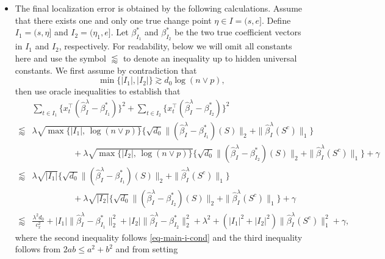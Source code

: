 \documentclass[twoside]{article}
\begin{document}
\begin{itemize}
			The fact that $\gamma$ is linear in the number of change point $K$ is to prompt the consistency.  This is shown in \eqref{eq:Khat=K} in the proof of . 
		\item The final localization error is obtained by the following calculations.  Assume that there exists one and only one true change point $\eta \in I = (s, e]$.  Define $I_1 = (s, \eta]$ and $I_2 = (\eta_1, e]$.  Let $\beta^*_{I_1}$ and $\beta^*_{I_2}$ be the two true coefficient vectors in $I_1$ and $I_2$, respectively.   For readability, below we will omit all constants here and use the symbol $\lessapprox$ to denote an inequality up to hidden universal constants.  We first assume by contradiction that
			\begin{equation}\label{eq-main-i-cond}
				\min\{|I_1|, |I_2|\} \gtrsim d_0 \log(n \vee p),
 			\end{equation}
 			then use oracle inequalities to establish that
			\begin{align}
				& \sum_{t \in I_1} \{x_t^{\top} (\widehat{\beta}^{\lambda}_I - \beta^*_{I_1})\}^2 + \sum_{t \in I_2} \{x_t^{\top} (\widehat{\beta}^{\lambda}_I - \beta^*_{I_2})\}^2 \nonumber \\
				\lessapprox & \lambda\sqrt{\max\{|I_1|, \, \log(n \vee p)\}} \big\{\sqrt{d_0}\|(\widehat{\beta}^{\lambda}_I - \beta^*_{I_1})(S)\|_2 + \|\widehat{\beta}^{\lambda}_I(S^c)\|_1\big\} \nonumber \\
				& \hspace{2cm} + \lambda\sqrt{\max\{|I_2|, \, \log(n \vee p)\}} \big\{\sqrt{d_0}\|(\widehat{\beta}^{\lambda}_I - \beta^*_{I_2})(S)\|_2 + \|\widehat{\beta}^{\lambda}_I(S^c)\|_1\big\} + \gamma \nonumber\\				
				\lessapprox & \lambda\sqrt{|I_1|} \big\{\sqrt{d_0}\|(\widehat{\beta}^{\lambda}_I - \beta^*_{I_1})(S)\|_2 + \|\widehat{\beta}^{\lambda}_I(S^c)\|_1\big\} \nonumber \\
				& \hspace{2cm} + \lambda\sqrt{|I_2|} \big\{\sqrt{d_0}\|(\widehat{\beta}^{\lambda}_I - \beta^*_{I_2})(S)\|_2 + \|\widehat{\beta}^{\lambda}_I(S^c)\|_1\big\} + \gamma \nonumber\\
				\lessapprox & \frac{\lambda^2 d_0}{c_x^2} + |I_1| \|\widehat{\beta}^{\lambda}_I - \beta^*_{I_1}\|_2^2 + |I_2| \|\widehat{\beta}^{\lambda}_I - \beta^*_{I_2}\|_2^2 + \lambda^2 + (|I_1|^2 + |I_2|^2)\|\widehat{\beta}^{\lambda}_I(S^c)\|_1^2  + \gamma, \label{eq-illustrate-upper}		 
			\end{align}
			where the second inequality follows \eqref{eq-main-i-cond} and the third inequality follows from $2ab \leq a^2 + b^2$ and from setting

\end{itemize}
\end{document}
